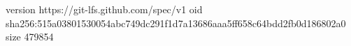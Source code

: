 version https://git-lfs.github.com/spec/v1
oid sha256:515a03801530054abc749dc291f1d7a13686aaa5ff658c64bdd2fb0d186802a0
size 479854
